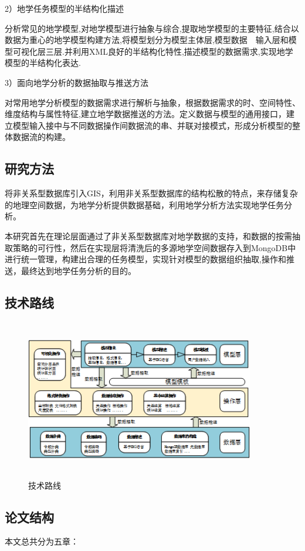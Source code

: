 \documentclass[master]{njnuthesis}
\begin{document}
2）地学任务模型的半结构化描述

分析常见的地学模型,对地学模型进行抽象与综合,提取地学模型的主要特征,结合以数据为重心的地学模型构建方法,将模型划分为模型主体层,模型数据　输入层和模型可视化层三层.并利用XML良好的半结构化特性,描述模型的数据需求,实现地学模型的半结构化表达.

3）面向地学分析的数据抽取与推送方法

对常用地学分析模型的数据需求进行解析与抽象，根据数据需求的时、空间特性、维度结构与属性特征,建立地学数据推送的方法。定义数据与模型的通用接口，建立模型输入接中与不同数据操作间数据流的串、并联对接模式，形成分析模型的整体数据流的构建。

\subsection{研究方法}
将非关系型数据库引入GIS，利用非关系型数据库的结构松散的特点，来存储复杂的地理空间数据，为地学分析提供数据基础，利用地学分析方法实现地学任务分析。

本研究首先在理论层面通过了非关系型数据库对地学数据的支持，和数据的按需抽取策略的可行性，然后在实现层将清洗后的多源地学空间数据存入到MongoDB中进行统一管理，构建出合理的任务模型，实现针对模型的数据组织抽取,操作和推送，最终达到地学任务分析的目的。

\subsection{技术路线}
\begin{figure}[!htb]
\begin{center}
\includegraphics[angle=0,width=10cm,height=7cm]{pic/road.png}
\caption{技术路线}
\label{fig:1}
\end{center}
\end{figure}

\subsection{论文结构}
本文总共分为五章：
\end{document}
